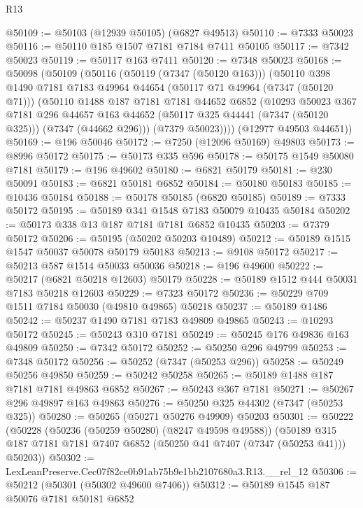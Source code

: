 \begin{lexlean}{R13}
\begin{coremodule}
@50109 := @50103 (@12939 @50105) (@6827 @49513)
@50110 := @7333 @50023
@50116 := @50110 @185 @1507 @7181 @7184 @7411 @50105
@50117 := @7342 @50023
@50119 := @50117 @163 @7411
@50120 := @7348 @50023
@50168 := @50098
    (@50109
      (@50116
        (@50119 (@7347 (@50120 @163)))
        (@50110
          @398
          @1490
          @7181
          @7183
          @49964
          @44654
          (@50117 @71 @49964 (@7347 (@50120 @71)))
          (@50110
            @1488
            @187
            @7181
            @7181
            @44652
            @6852
            (@10293
              @50023
              @367
              @7181
              @296
              @44657
              @163
              @44652
              (@50117 @325 @44441 (@7347 (@50120 @325)))
              (@7347 (@44662 @296)))
            (@7379 @50023))))
      (@12977 @49503 @44651))
@50169 := @196 @50046
@50172 := @7250 (@12096 @50169) @49803
@50173 := @8996 @50172
@50175 := @50173 @335 @596
@50178 := @50175 @1549 @50080 @7181
@50179 := @196 @49602
@50180 := @6821 @50179
@50181 := @230 @50091
@50183 := @6821 @50181 @6852
@50184 := @50180 @50183
@50185 := @10436 @50184
@50188 := @50178 @50185 (@6820 @50185)
@50189 := @7333 @50172
@50195 := @50189 @341 @1548 @7183 @50079 @10435 @50184
@50202 := @50173 @338 @13 @187 @7181 @7181 @6852 @10435
@50203 := @7379 @50172
@50206 := @50195 (@50202 @50203 @10489)
@50212 := @50189 @1515 @1547 @50037 @50078 @50179 @50183
@50213 := @9108 @50172
@50217 := @50213 @587 @1514 @50033 @50036
@50218 := @196 @49600
@50222 := @50217 (@6821 @50218 @12603) @50179
@50228 := @50189 @1512 @444 @50031 @7183 @50218 @12603
@50229 := @7323 @50172
@50236 := @50229 @709 @1511 @7184 @50030 (@49810 @49865) @50218
@50237 := @50189 @1486
@50242 := @50237 @1490 @7181 @7183 @49809 @49865
@50243 := @10293 @50172
@50245 := @50243 @310 @7181
@50249 := @50245 @176 @49836 @163 @49809
@50250 := @7342 @50172
@50252 := @50250 @296 @49799
@50253 := @7348 @50172
@50256 := @50252 (@7347 (@50253 @296))
@50258 := @50249 @50256 @49850
@50259 := @50242 @50258
@50265 := @50189 @1488 @187 @7181 @7181 @49863 @6852
@50267 := @50243 @367 @7181
@50271 := @50267 @296 @49897 @163 @49863
@50276 := @50250 @325 @44302 (@7347 (@50253 @325))
@50280 := @50265 (@50271 @50276 @49909) @50203
@50301 := @50222
    (@50228
      (@50236 (@50259 @50280) (@8247 @49598 @49588))
      (@50189 @315 @187 @7181 @7181 @7407 @6852 (@50250 @41 @7407 (@7347 (@50253 @41))) @50203))
@50302 := LexLeanPreserve.Cec07f82ce0b91ab75b9e1bb2107680a3.R13.__rel_12
@50306 := @50212 (@50301 (@50302 @49600 @7406))
@50312 := @50189 @1545 @187 @50076 @7181 @50181 @6852

\end{coremodule}
\end{lexlean}

